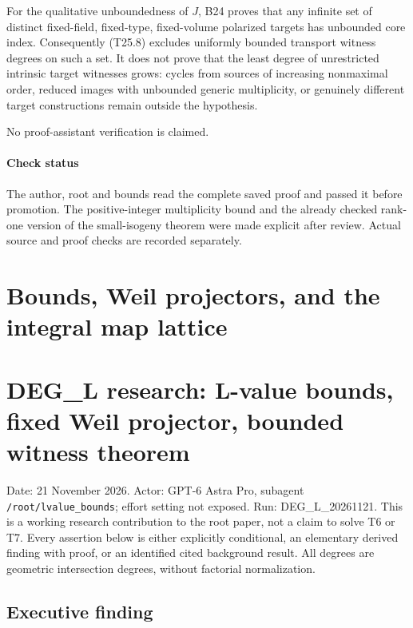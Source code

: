 \documentclass[11pt,a4paper]{article}
\providecommand{\tightlist}{\setlength{\itemsep}{0pt}\setlength{\parskip}{0pt}}
\theoremstyle{definition}
\begin{document}
For the qualitative unboundedness of \(J\), B24 proves that any infinite set of distinct fixed-field, fixed-type, fixed-volume polarized targets has unbounded core index. Consequently (T25.8) excludes uniformly bounded transport witness degrees on such a set. It does not prove that the least degree of unrestricted intrinsic target witnesses grows: cycles from sources of increasing nonmaximal order, reduced images with unbounded generic multiplicity, or genuinely different target constructions remain outside the hypothesis.

No proof-assistant verification is claimed.

\paragraph{Check status}\label{check-status-5}

The author, root and bounds read the complete saved proof and passed it before promotion. The positive-integer multiplicity bound and the already checked rank-one version of the small-isogeny theorem were made explicit after review. Actual source and proof checks are recorded separately.

\section{Bounds, Weil projectors, and the integral map lattice}

\providecommand{\tightlist}{\setlength{\itemsep}{0pt}\setlength{\parskip}{0pt}}
\section{DEG\_L research: L-value bounds, fixed Weil projector, bounded witness theorem}\label{deg_l-research-l-value-bounds-fixed-weil-projector-bounded-witness-theorem}

Date: 21 November 2026. Actor: GPT-6 Astra Pro, subagent \texttt{/root/lvalue\_bounds}; effort setting not exposed. Run: DEG\_L\_20261121. This is a working research contribution to the root paper, not a claim to solve T6 or T7. Every assertion below is either explicitly conditional, an elementary derived finding with proof, or an identified cited background result. All degrees are geometric intersection degrees, without factorial normalization.

\subsection{Executive finding}\label{executive-finding}
\end{document}
